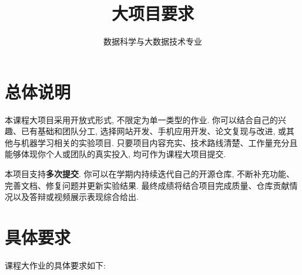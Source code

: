 \documentclass{../nndlcourse}
\begin{document}
\title{大项目要求}
\author{数据科学与大数据技术专业}
\date{ }
\maketitle


\section{总体说明}

本课程大项目采用开放式形式, 不限定为单一类型的作业. 你可以结合自己的兴趣、已有基础和团队分工, 选择网站开发、手机应用开发、论文复现与改进, 或其他与机器学习相关的实验项目. 只要项目内容充实、技术路线清楚、工作量充分且能够体现你个人或团队的真实投入, 均可作为课程大项目提交.

本项目支持\textbf{多次提交}. 你可以在学期内持续迭代自己的开源仓库, 不断补充功能、完善文档、修复问题并更新实验结果. 最终成绩将结合项目完成质量、仓库贡献情况以及答辩或视频展示表现综合给出.


\section{具体要求}

课程大作业的具体要求如下:
\end{document}

